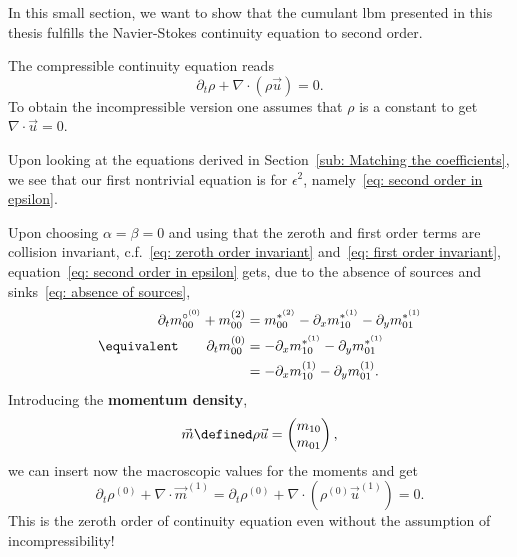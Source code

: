 In this small section, we want to show that the cumulant \gls{lbm} presented in this thesis fulfills the Navier-Stokes continuity equation to second order.

The compressible continuity equation reads
\begin{equation}
  \label{eq: continuity equation}
  \partial_t \rho + \nabla \cdot (\rho \vec{u}) = 0.
\end{equation}
To obtain the incompressible version one assumes that $\rho$ is a constant to get $\nabla\cdot\vec{u}=0$.

Upon looking at the equations derived in Section~\ref{sub: Matching the coefficients}, we see that our first nontrivial equation is for $\epsilon^2$, namely~\eqref{eq: second order in epsilon}.

Upon choosing $\alpha=\beta=0$ and using that the zeroth and first order terms are collision invariant, c.f.~\eqref{eq: zeroth order invariant} and~\eqref{eq: first order invariant}, equation~\eqref{eq: second order in epsilon} gets, due to the absence of sources and sinks~\eqref{eq: absence of sources},
\begin{align}
  \nonumber
  \partial_t m_{00}^{\circ^{(0)}} + m_{00}^{(2)} & =  m_{00}^{*^{(2)}} - \partial_x m_{10}^{*^{(1)}} - \partial_y m_{01}^{*^{(1)}}
   \\\equivalent \qquad
   \partial_t m_{00}^{(0)} & =  - \partial_x m_{10}^{*^{(1)}} - \partial_y m_{01}^{*^{(1)}} \nonumber
   \\
    & =  - \partial_x m_{10}^{(1)} - \partial_y m_{01}^{(1)}.
  \label{eq: continuity moments}
\end{align}
Introducing the \textbf{momentum density},
\begin{equation}
  \vec{m} \defined \rho \vec{u} = \begin{pmatrix}m_{10} \\m_{01}  \end{pmatrix},
\end{equation}
we can insert now the macroscopic values for the moments and get
\begin{equation}
  \partial_t \rho^{(0)} + \nabla \cdot \vec{m}^{(1)} =
  \partial_t \rho^{(0)} + \nabla \cdot (\rho^{(0)} \vec{u}^{(1)}) = 0.
\end{equation}
This is the zeroth order of continuity equation even without the assumption of incompressibility!

